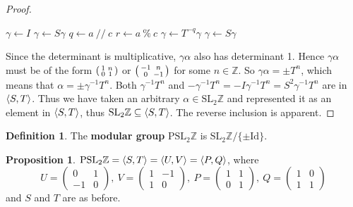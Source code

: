 \documentclass[12pt,twoside]{reedthesis}
\theoremstyle{definition}
\newtheorem{defn}[thm]{Definition}
\newtheorem{prop}[thm]{Proposition}
\newcommand{\Z}{\mathbb{Z}}
\newcommand{\SLZ}{\mathrm{SL}_2{\Z}}
\newcommand{\PSLZ}{\mathrm{PSL}_2{\Z}}
\newcommand{\Id}{\mathrm{Id}}
\newcommand{\defnphrase}[1]{\textbf{#1}}
\DeclarePairedDelimiter\ang{\langle}{\rangle}
\begin{document}
\begin{proof}
  \vspace{1em}
  \begin{algorithmic}
    \State $\gamma \gets I$
      $\gamma \gets S \gamma$
    \EndIf
      \State $q \gets a \ // \ c$
      \State $r \gets a\ \% \ c$
      \State $\gamma \gets T^{-q} \gamma$
        $\gamma \gets S \gamma$
      \EndIf
    \EndWhile
  \end{algorithmic}

  Since the determinant is multiplicative, $\gamma \alpha$ also has determinant 1.
  Hence $\gamma\alpha$ must be of the form $\begin{psmallmatrix}1 & n \\ 0 & 1\end{psmallmatrix}$ or $\begin{psmallmatrix}-1 & n \\ 0 & -1\end{psmallmatrix}$ for some $n \in \Z$.
  So $\gamma \alpha = \pm T^n$, which means that $\alpha = \pm \gamma^{-1} T^n$.
  Both $\gamma^{-1} T^n$ and $-\gamma^{-1} T^n = -I \gamma^{-1} T^n = S^2 \gamma^{-1} T^n$ are in $\ang{S,T}$.
  Thus we have taken an arbitrary $\alpha \in \SLZ$ and represented it as an element in $\ang{S,T}$, thus $\SLZ \subseteq \ang{S,T}$.
  The reverse inclusion is apparent.
\end{proof}

\begin{defn}
  The \defnphrase{modular group} $\PSLZ$ is $\SLZ / \{ \pm \Id \}$.
\end{defn}

\begin{prop}\label{prop:pslgenerators}
  $\PSLZ = \ang{S, T} = \ang{U,V} = \ang{P,Q}$, where
  \begin{equation*}
    U = \begin{pmatrix}
      0 & 1 \\
      -1 & 0
    \end{pmatrix},\
    V = \begin{pmatrix}
      1 & -1 \\
      1 & 0
    \end{pmatrix},\
    P = \begin{pmatrix}
      1 & 1 \\
      0 & 1
    \end{pmatrix},\
    Q = \begin{pmatrix}
      1 & 0 \\
      1 & 1
    \end{pmatrix}
  \end{equation*}
  and $S$ and $T$ are as before.
\end{prop}
\end{document}
